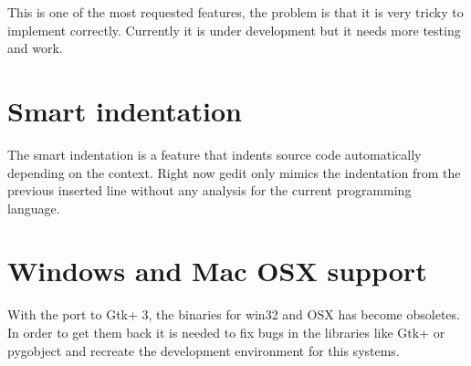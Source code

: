 This is one of the most requested features, the problem is that it is very tricky to implement correctly. Currently it is under development but it needs more testing and work.

\section{Smart indentation}

The smart indentation is a feature that indents source code automatically depending on the context. Right now gedit only mimics the indentation from the previous inserted line without any analysis for the current programming language.

\section{Windows and Mac OSX support}

With the port to Gtk+ 3, the binaries for win32 and OSX has become obsoletes. In order to get them back it is needed to fix bugs in the libraries like Gtk+ or pygobject and recreate the development environment for this systems.
